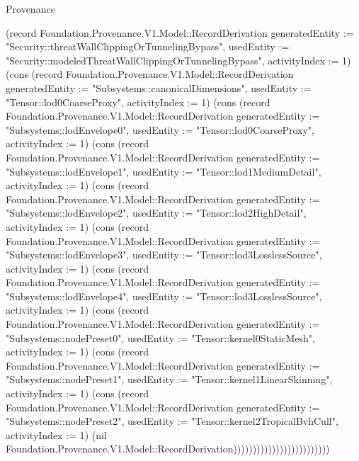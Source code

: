 \begin{lexlean}{Provenance}
\begin{semanticmodule}
{(record Foundation.Provenance.V1.Model::RecordDerivation {generatedEntity := "Security::threatWallClippingOrTunnelingBypass", usedEntity := "Security::modeledThreatWallClippingOrTunnelingBypass", activityIndex := 1}) (cons (record Foundation.Provenance.V1.Model::RecordDerivation {generatedEntity := "Subsystems::canonicalDimensions", usedEntity := "Tensor::lod0CoarseProxy", activityIndex := 1}) (cons (record Foundation.Provenance.V1.Model::RecordDerivation {generatedEntity := "Subsystems::lodEnvelope0", usedEntity := "Tensor::lod0CoarseProxy", activityIndex := 1}) (cons (record Foundation.Provenance.V1.Model::RecordDerivation {generatedEntity := "Subsystems::lodEnvelope1", usedEntity := "Tensor::lod1MediumDetail", activityIndex := 1}) (cons (record Foundation.Provenance.V1.Model::RecordDerivation {generatedEntity := "Subsystems::lodEnvelope2", usedEntity := "Tensor::lod2HighDetail", activityIndex := 1}) (cons (record Foundation.Provenance.V1.Model::RecordDerivation {generatedEntity := "Subsystems::lodEnvelope3", usedEntity := "Tensor::lod3LosslessSource", activityIndex := 1}) (cons (record Foundation.Provenance.V1.Model::RecordDerivation {generatedEntity := "Subsystems::lodEnvelope4", usedEntity := "Tensor::lod3LosslessSource", activityIndex := 1}) (cons (record Foundation.Provenance.V1.Model::RecordDerivation {generatedEntity := "Subsystems::nodePreset0", usedEntity := "Tensor::kernel0StaticMesh", activityIndex := 1}) (cons (record Foundation.Provenance.V1.Model::RecordDerivation {generatedEntity := "Subsystems::nodePreset1", usedEntity := "Tensor::kernel1LinearSkinning", activityIndex := 1}) (cons (record Foundation.Provenance.V1.Model::RecordDerivation {generatedEntity := "Subsystems::nodePreset2", usedEntity := "Tensor::kernel2TropicalBvhCull", activityIndex := 1}) (nil Foundation.Provenance.V1.Model::RecordDerivation)))))))))))))))))))))))))
}


\end{semanticmodule}
\end{lexlean}
